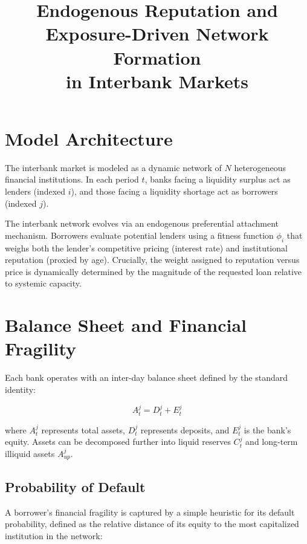 \documentclass{article}
\title{Endogenous Reputation and Exposure-Driven Network Formation \\ in Interbank Markets}
\author{}
\date{}
\begin{document}
\maketitle

\tableofcontents
\newpage

\section{Model Architecture}

\noindent The interbank market is modeled as a dynamic network of $N$ heterogeneous financial institutions. In each period $t$, banks facing a liquidity surplus act as lenders (indexed $i$), and those facing a liquidity shortage act as borrowers (indexed $j$). 

The interbank network evolves via an endogenous preferential attachment mechanism. Borrowers evaluate potential lenders using a fitness function $\phi_i$ that weighs both the lender's competitive pricing (interest rate) and institutional reputation (proxied by age). Crucially, the weight assigned to reputation versus price is dynamically determined by the magnitude of the requested loan relative to systemic capacity.

\section{Balance Sheet and Financial Fragility}

\noindent Each bank operates with an inter-day balance sheet defined by the standard identity:

\begin{equation}
    A^j_t = D^j_t + E^j_t
\end{equation}

\noindent where $A^j_t$ represents total assets, $D^j_t$ represents deposits, and $E^j_t$ is the bank's equity. Assets can be decomposed further into liquid reserves $C^j_t$ and long-term illiquid assets $A^j_{up}$.

\subsection{Probability of Default}

\noindent A borrower's financial fragility is captured by a simple heuristic for its default probability, defined as the relative distance of its equity to the most capitalized institution in the network:
\end{document}
